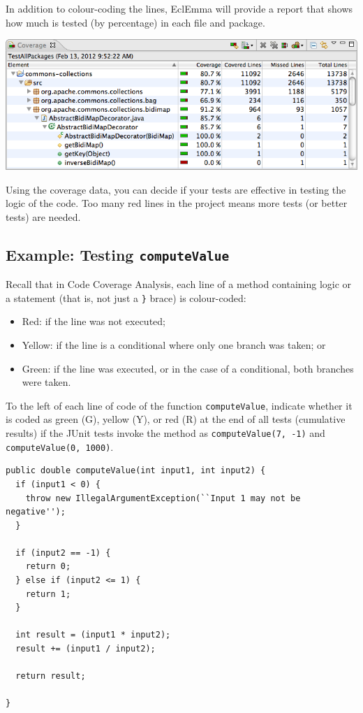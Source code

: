 In addition to colour-coding the lines, EclEmma will provide a report that shows how much is tested (by percentage) in each file and package.

\begin{center}
	\includegraphics[width=\textwidth]{images/coverageview.png}
\end{center}

Using the coverage data, you can decide if your tests are effective in testing the logic of the code. Too many red lines in the project means more tests (or better tests) are needed.

\subsection*{Example: Testing \texttt{computeValue}}

Recall that in Code Coverage Analysis, each line of a method containing logic or a statement (that is, not just a \texttt{\}} brace) is colour-coded:
\vspace{-1em}
\begin{itemize}
\item Red: if the line was not executed;
\item Yellow: if the line is a conditional where only one branch was taken;
or
\item Green: if the line was executed, or in the case of a conditional, both branches were taken.
\end{itemize}
\vspace{-1em}
To the left of each line of code of the function \texttt{computeValue}, indicate whether it is coded as green (G), yellow (Y), or red (R) at the end of all tests (cumulative results) if the JUnit tests invoke the method as \texttt{computeValue(7, -1)} and \texttt{computeValue(0, 1000)}.

\begin{verbatim}
public double computeValue(int input1, int input2) {
  if (input1 < 0) {
    throw new IllegalArgumentException(``Input 1 may not be negative'');
  }
  
  if (input2 == -1) {
    return 0;
  } else if (input2 <= 1) {
    return 1;
  }
 
  int result = (input1 * input2); 
  result += (input1 / input2);
  
  return result;

}
\end{verbatim}

